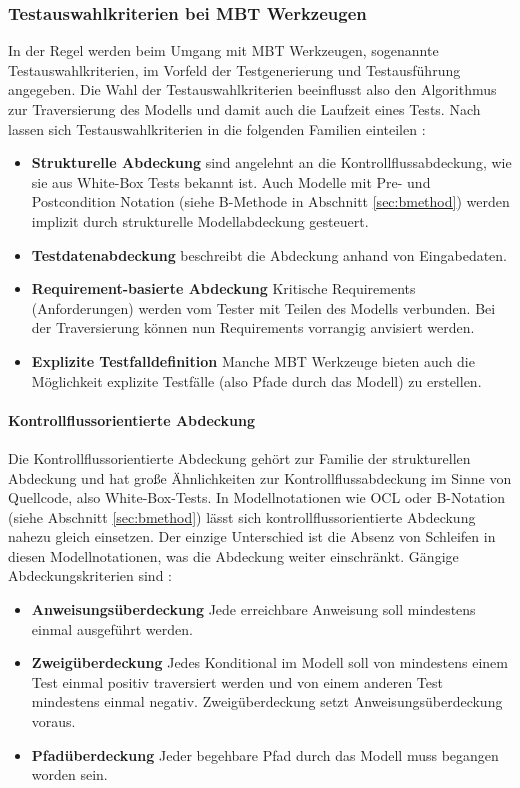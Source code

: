 \subsubsection{Testauswahlkriterien bei \Gls{MBT} Werkzeugen}
In der Regel werden beim Umgang mit \Gls{MBT} Werkzeugen, sogenannte Testauswahlkriterien, im Vorfeld der Testgenerierung und Testausführung angegeben. Die Wahl der Testauswahlkriterien beeinflusst also den Algorithmus zur Traversierung des Modells und damit auch die Laufzeit eines Tests. Nach \citeauthor{utting_practical_2007} lassen sich Testauswahlkriterien in die folgenden Familien einteilen \cite{utting_practical_2007}:

\begin{itemize}
\item \textbf{Strukturelle Abdeckung} sind angelehnt an die Kontrollflussabdeckung, wie sie aus White-Box Tests bekannt ist. Auch Modelle mit Pre- und Postcondition Notation (siehe B-Methode in Abschnitt \ref{sec:bmethod}) werden implizit durch strukturelle Modellabdeckung gesteuert.
\item \textbf{Testdatenabdeckung} beschreibt die Abdeckung anhand von Eingabedaten.
\item \textbf{Requirement-basierte Abdeckung} Kritische Requirements (Anforderungen) werden vom Tester mit Teilen des Modells verbunden. Bei der Traversierung können nun Requirements vorrangig anvisiert werden.
\item \textbf{Explizite Testfalldefinition} Manche \Gls{MBT} Werkzeuge bieten auch die Möglichkeit explizite Testfälle (also Pfade durch das Modell) zu erstellen.
\end{itemize}

\paragraph{Kontrollflussorientierte Abdeckung}\label{coverage_control} Die Kontrollflussorientierte Abdeckung gehört zur Familie der strukturellen Abdeckung und hat große Ähnlichkeiten zur Kontrollflussabdeckung im Sinne von Quellcode, also White-Box-Tests. In Modellnotationen wie OCL \cite{warmer_object_2004} oder B-Notation (siehe Abschnitt \ref{sec:bmethod}) lässt sich kontrollflussorientierte Abdeckung nahezu gleich einsetzen. Der einzige Unterschied ist die Absenz von Schleifen in diesen Modellnotationen, was die Abdeckung weiter einschränkt. Gängige Abdeckungskriterien sind \cite{rossner_basiswissen_2010}:
\begin{itemize}
\item \textbf{Anweisungsüberdeckung} Jede erreichbare Anweisung soll mindestens einmal ausgeführt werden.
\item \textbf{Zweigüberdeckung} Jedes Konditional im Modell soll von mindestens einem Test einmal positiv traversiert werden und von einem anderen Test mindestens einmal negativ. Zweigüberdeckung setzt Anweisungsüberdeckung voraus.
\item \textbf{Pfadüberdeckung} Jeder begehbare Pfad durch das Modell muss begangen worden sein.
\end{itemize}

